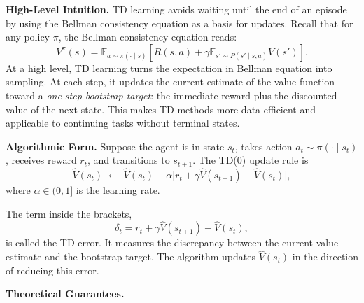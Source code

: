 \documentclass[
]{book}
\theoremstyle{definition}
\theoremstyle{definition}
\theoremstyle{definition}
\theoremstyle{definition}
\theoremstyle{remark}
\begin{document}
\textbf{High-Level Intuition.} TD learning avoids waiting until the end of an episode by using the Bellman consistency equation as a basis for updates. Recall that for any policy \(\pi\), the Bellman consistency equation reads:
\begin{equation}
V^\pi(s) = \mathbb{E}_{a \sim \pi(\cdot \mid s)} \left[ R(s,a) + \gamma \mathbb{E}_{s' \sim P(s' \mid s, a)} V(s')  \right].
\label{eq:InfiniteHorizonBellmanConsistencyRestate}
\end{equation}
At a high level, TD learning turns the expectation in Bellman equation into sampling.
At each step, it updates the current estimate of the value function toward a \emph{one-step bootstrap target}: the immediate reward plus the discounted value of the next state. This makes TD methods more data-efficient and applicable to continuing tasks without terminal states.

\textbf{Algorithmic Form.} Suppose the agent is in state \(s_t\), takes action \(a_t \sim \pi(\cdot \mid s_t)\), receives reward \(r_t\), and transitions to \(s_{t+1}\). The TD(0) update rule is
\begin{equation}
\hat{V}(s_t) \;\leftarrow\; \hat{V}(s_t) + \alpha \big[ r_t + \gamma \hat{V}(s_{t+1}) - \hat{V}(s_t) \big],
\label{eq:TDZeroUpdate}
\end{equation}
where \(\alpha \in (0,1]\) is the learning rate.

The term inside the brackets,
\begin{equation}
\delta_t = r_t + \gamma \hat{V}(s_{t+1}) - \hat{V}(s_t),
\label{eq:TDError}
\end{equation}
is called the TD error. It measures the discrepancy between the current value estimate and the bootstrap target. The algorithm updates \(\hat{V}(s_t)\) in the direction of reducing this error.

\textbf{Theoretical Guarantees.}
\end{document}
